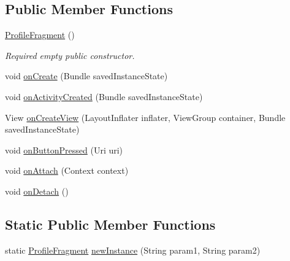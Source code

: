 \subsection*{Public Member Functions}
\begin{DoxyCompactItemize}
\item 
\hyperlink{classcom_1_1example_1_1sel_1_1lostfound_1_1ProfileFragment_aff25ba9b20da50fa32a808f25c0229d6}{Profile\+Fragment} ()
\begin{DoxyCompactList}\small\item\em Required empty public constructor. \end{DoxyCompactList}\item 
void \hyperlink{classcom_1_1example_1_1sel_1_1lostfound_1_1ProfileFragment_a52a51c0a57347d86da5de367f715076f}{on\+Create} (Bundle saved\+Instance\+State)
\item 
void \hyperlink{classcom_1_1example_1_1sel_1_1lostfound_1_1ProfileFragment_a1930f4c070b5d7a4204422f4e0ddc35f}{on\+Activity\+Created} (Bundle saved\+Instance\+State)
\item 
View \hyperlink{classcom_1_1example_1_1sel_1_1lostfound_1_1ProfileFragment_a7bb29240ea89cc1f9c5539dd9117765e}{on\+Create\+View} (Layout\+Inflater inflater, View\+Group container, Bundle saved\+Instance\+State)
\item 
void \hyperlink{classcom_1_1example_1_1sel_1_1lostfound_1_1ProfileFragment_a5d06af34470ca3d940361d9315cd98fb}{on\+Button\+Pressed} (Uri uri)
\item 
void \hyperlink{classcom_1_1example_1_1sel_1_1lostfound_1_1ProfileFragment_a22ef41a710d02636086eb5b6b01a2e1e}{on\+Attach} (Context context)
\item 
void \hyperlink{classcom_1_1example_1_1sel_1_1lostfound_1_1ProfileFragment_a922ba5757676d5642082baaed332dfb1}{on\+Detach} ()
\end{DoxyCompactItemize}
\subsection*{Static Public Member Functions}
\begin{DoxyCompactItemize}
\item 
static \hyperlink{classcom_1_1example_1_1sel_1_1lostfound_1_1ProfileFragment}{Profile\+Fragment} \hyperlink{classcom_1_1example_1_1sel_1_1lostfound_1_1ProfileFragment_a2a0246ef59fbd7dd833eb7db772302c6}{new\+Instance} (String param1, String param2)
\end{DoxyCompactItemize}


